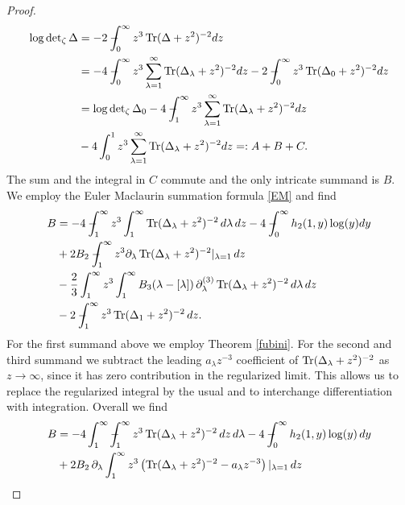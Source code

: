 \begin{proof}

\begin{equation}
\label{ABC}
\begin{split}
\log \det\nolimits_{\zeta} \Delta &= -2 \regint_0^\infty z^3 \Tr(\Delta + z^2)^{-2} dz \\
&= - 4 \regint_0^\infty z^3 \sum_{\lambda=1}^\infty \Tr(\Delta_\lambda + z^2)^{-2} dz 
- 2  \regint_0^\infty z^3 \Tr(\Delta_0 + z^2)^{-2} dz \\
&= \log \det\nolimits_{\zeta} \Delta_0 
-4 \regint_1^\infty z^3 \sum_{\lambda=1}^\infty \Tr(\Delta_\lambda + z^2)^{-2} dz \\
&-4 \int_0^1 z^3 \sum_{\lambda=1}^\infty \Tr(\Delta_\lambda + z^2)^{-2} dz=:A+B+C.
\end{split}
\end{equation}
The sum and the integral in $C$ commute and the only intricate summand is $B$.
We employ the Euler Maclaurin summation formula \eqref{EM} and find
\begin{equation}
\begin{split}
B &= -4 \regint_1^\infty z^3 \int_1^\infty \Tr(\Delta_\lambda + z^2)^{-2} \, d\lambda \, dz 
- 4 \regint_0^\infty h_{2}(1,y) \log (y) dy \\
&+ 2 B_2 \regint_1^\infty z^3 \partial_\lambda \Tr(\Delta_\lambda + z^2)^{-2}|_{\lambda=1} \, dz \\
&-\frac{2}{3} \int_1^\infty z^3 \int_1^\infty B_3(\lambda-[\lambda]) \, \partial_\lambda^{(3)} 
\Tr(\Delta_\lambda + z^2)^{-2} \, d\lambda \, dz \\
& - 2 \regint_1^\infty z^3 \Tr(\Delta_1 + z^2)^{-2} \, dz.
\end{split}
\end{equation}
For the first summand above we employ Theorem \ref{fubini}.
For the second and third summand we subtract the leading $a_\lambda z^{-3}$ coefficient 
of $\operatorname{Tr}(\Delta_\lambda + z^2)^{-2}$ as $z\to \infty$, since 
it has zero contribution in the regularized limit. This allows us to 
replace the regularized integral by the usual and to interchange differentiation 
with integration. Overall we find
\begin{equation}
\begin{split}
B &= -4 \int_1^\infty \regint_1^\infty z^3 \Tr(\Delta_\lambda + z^2)^{-2}  \, dz \, d\lambda
- 4 \regint_0^\infty h_{2}(1,y)\log(y)\, dy \\
&+ 2 B_2 \, \partial_\lambda \int_1^\infty z^3  \left( \Tr(\Delta_\lambda + z^2)^{-2} - a_\lambda z^{-3}\right)|_{\lambda=1} \, dz \\

\end{split}
\end{equation}
\end{proof}
